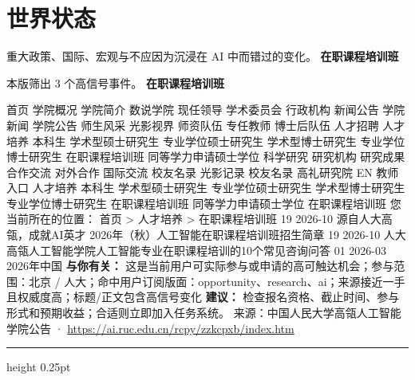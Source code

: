\documentclass[10.5pt]{ctexart}
\begin{document}
\section*{世界状态}
{\color{ormuted} 重大政策、国际、宏观与不应因为沉浸在 AI 中而错过的变化。}
\vspace{2mm}
{\LARGE\bfseries 在职课程培训班}\par
\vspace{1mm}
{\color{ormuted} 本版筛出 3 个高信号事件。}
\vspace{3mm}
{\Large\bfseries 在职课程培训班}\par
首页 学院概况 学院简介 数说学院 现任领导 学术委员会 行政机构 新闻公告 学院新闻 学院公告 师生风采 光影视界 师资队伍 专任教师 博士后队伍 人才招聘 人才培养 本科生 学术型硕士研究生 专业学位硕士研究生 学术型博士研究生 专业学位博士研究生 在职课程培训班 同等学力申请硕士学位 科学研究 研究机构 研究成果 合作交流 对外合作 国际交流 校友名录 光影记录 校友名录 高礼研究院 EN 教师入口 人才培养 本科生 学术型硕士研究生 专业学位硕士研究生 学术型博士研究生 专业学位博士研究生 在职课程培训班 同等学力申请硕士学位 在职课程培训班 您当前所在的位置： 首页 > 人才培养 > 在职课程培训班 19 2026-10 源自人大高瓴，成就AI英才 2026年（秋）人工智能在职课程培训班招生简章 19 2026-10 人大高瓴人工智能学院人工智能专业在职课程培训的10个常见咨询问答 01 2026-03 2026年中国
\textbf{与你有关：} 这是当前用户可实际参与或申请的高可触达机会；参与范围：北京 / 人大；命中用户订阅版面：opportunity、research、ai；来源接近一手且权威度高；标题/正文包含高信号变化
\textbf{建议：} 检查报名资格、截止时间、参与形式和预期收益；合适则立即加入任务系统。
{\footnotesize\color{ormuted} 来源：中国人民大学高瓴人工智能学院公告 · \url{https://ai.ruc.edu.cn/rcpy/zzkcpxb/index.htm}}
\vspace{4mm}
\hrule height 0.25pt
\vspace{3mm}
\end{document}
